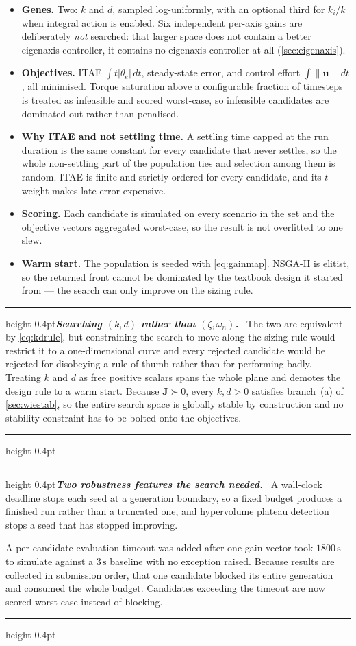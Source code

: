 \documentclass[conference,10pt,a4paper]{IEEEtran}
\newcommand{\remarkrule}{\par\nobreak\vspace{2pt}%
  \hrule height 0.4pt\vspace{4pt}\nobreak}
\newenvironment{designbox}[1][Design decision]
  {\par\medskip\remarkrule\noindent\small\textbf{\textit{#1.}}\ \ignorespaces}
  {\par\vspace{3pt}\hrule height 0.4pt\par\medskip\ignorespacesafterend}
\newcommand{\vect}[1]{\bm{#1}}
\newcommand{\mat}[1]{\bm{#1}}
\newcommand{\unit}[1]{\ensuremath{\,\mathrm{#1}}}
\begin{document}
\begin{itemize}
\item \textbf{Genes.} Two: $k$ and $d$, sampled log-uniformly, with an optional
third for $k_i/k$ when integral action is enabled. Six independent per-axis
gains are deliberately \emph{not} searched: that larger space does not contain
a better eigenaxis controller, it contains no eigenaxis controller at all
(\cref{sec:eigenaxis}).
\item \textbf{Objectives.} ITAE $\int t|\theta_e|\,dt$, steady-state error, and
control effort $\int\|\vect{u}\|\,dt$, all minimised. Torque saturation above a
configurable fraction of timesteps is treated as infeasible and scored
worst-case, so infeasible candidates are dominated out rather than penalised.
\item \textbf{Why ITAE and not settling time.} A settling time capped at the
run duration is the same constant for every candidate that never settles, so
the whole non-settling part of the population ties and selection among them is
random. ITAE is finite and strictly ordered for every candidate, and its $t$
weight makes late error expensive.
\item \textbf{Scoring.} Each candidate is simulated on every scenario in the
set and the objective vectors aggregated worst-case, so the result is not
overfitted to one slew.
\item \textbf{Warm start.} The population is seeded with \cref{eq:gainmap}.
NSGA-II is elitist, so the returned front cannot be dominated by the textbook
design it started from --- the search can only improve on the sizing rule.
\end{itemize}

\begin{designbox}[Searching $(k,d)$ rather than $(\zeta,\omega_n)$]
The two are equivalent by \cref{eq:kdrule}, but constraining the search to move
along the sizing rule would restrict it to a one-dimensional curve and every
rejected candidate would be rejected for disobeying a rule of thumb rather than
for performing badly. Treating $k$ and $d$ as free positive scalars spans the
whole plane and demotes the design rule to a warm start. Because
$\mat{J}\succ0$, every $k,d>0$ satisfies branch~(a) of \cref{sec:wiestab}, so
the entire search space is globally stable by construction and no stability
constraint has to be bolted onto the objectives.
\end{designbox}

\begin{designbox}[Two robustness features the search needed]
A wall-clock deadline stops each seed at a generation boundary, so a fixed
budget produces a finished run rather than a truncated one, and hypervolume
plateau detection stops a seed that has stopped improving.

A per-candidate evaluation timeout was added after one gain vector took
$1800\unit{s}$ to simulate against a $3\unit{s}$ baseline with no exception
raised. Because results are collected in submission order, that one candidate
blocked its entire generation and consumed the whole budget. Candidates
exceeding the timeout are now scored worst-case instead of blocking.
\end{designbox}
\end{document}
